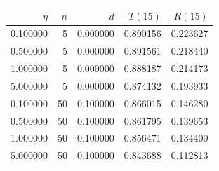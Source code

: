 \begin{tabular}{rrrrr}
\toprule
$\eta$ & $n$ & $d$ & $T(15)$ & $R(15)$ \\
\midrule
0.100000 & 5 & 0.000000 & 0.890156 & 0.223627 \\
0.500000 & 5 & 0.000000 & 0.891561 & 0.218440 \\
1.000000 & 5 & 0.000000 & 0.888187 & 0.214173 \\
5.000000 & 5 & 0.000000 & 0.874132 & 0.193933 \\
0.100000 & 50 & 0.100000 & 0.866015 & 0.146280 \\
0.500000 & 50 & 0.100000 & 0.861795 & 0.139653 \\
1.000000 & 50 & 0.100000 & 0.856471 & 0.134400 \\
5.000000 & 50 & 0.100000 & 0.843688 & 0.112813 \\
\bottomrule
\end{tabular}
